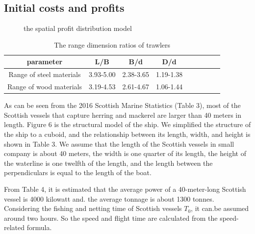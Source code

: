 \documentclass{mcmthesis}
\begin{document}
\subsection{Initial costs and profits}
\begin{figure}[h]
  \caption{the spatial profit distribution model}\label{figure1}
\end{figure}

\begin{table}[!htb]
\centering
\setlength{\abovecaptionskip}{0pt}%
\setlength{\belowcaptionskip}{15pt}%
\caption{The range dimension ratios of  trawlers}
\begin{tabular}{ccccccccc}
\toprule[1.5pt]
parameter &L/B&B/d&D/d\\
\toprule[1.5pt]
Range of steel materials&3.93-5.00&2.38-3.65&1.19-1.38\\
Range of wood materials&3.19-4.53&2.61-4.67&1.06-1.44\\
\bottomrule[1.5pt]
\end{tabular}
\end{table}

As can be seen from the 2016 Scottish Marine Statistics (Table 3), most of the Scottish vessels that capture herring and mackerel are larger than 40 meters in length. Figure 6 is the structural model of the ship. We simplified the structure of the ship to a cuboid, and the relationship between its length, width, and height is shown in Table 3. We assume that the length of the Scottish vessels in small company is about 40 meters, the width is one quarter of its length, the height of the waterline is one twelfth of the length, and the length between the  perpendiculars  is equal to the length of the boat.


From Table 4, it is estimated that the average power of a 40-meter-long Scottish vessel is 4000 kilowatt and. the average tonnage is about 1300 tonnes. Considering the fishing and netting time of Scottish vessels  $T_0$, it can.be assumed around two hours. So the speed and flight time are calculated from the speed-related formula.
\end{document}
